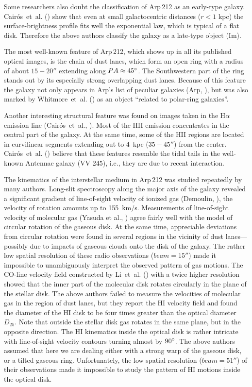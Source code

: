 \documentclass{ab}
\def\degr{\hbox{$^\circ$}}
\begin{document}
Some researchers also doubt the classification of
Arp\,212 as an early-type galaxy.  Cair\'{o}s~et~al. (\cite{cairos1:Moiseev_n}) show that even at small galactocentric distances ($r<1$ kpc) the surface-brightness profile fits well the exponential law, which is typical of a flat disk. Therefore the above authors classify the galaxy as a
late-type object (Im). 

The most well-known feature of  Arp\,212, which shows up in all
its published optical images, is the chain of dust lanes, which
form an open ring with a radius of about $15-20''$ extending along
\mbox{$PA\approx45\degr$.} The Southwestern part of the ring
stands out by its especially strong overlapping dust lanes.
Because of this feature the galaxy not only appears in Arp's list
of peculiar galaxies (Arp, \cite{arp:Moiseev_n}), but was also marked by
Whitmore~et~al. (\cite{w90:Moiseev_n}) as an object ``related to
polar-ring galaxies''.

Another interesting structural feature was found on images taken
in the H$\alpha$ emission line (Cair\'{o}s~et~al., \cite{cairos2:Moiseev_n}). Most of
the HII emission concentrates in the central part of the galaxy.
At the same time, some of the HII regions are located in
curvilinear segments extending out to 4~kpc ($35-45''$) from the
center. Cair\'{o}s~et~al. (\cite{cairos2:Moiseev_n}) believe that
these features resemble the tidal tails in the well-known Antennae
galaxy (VV 245), i.e., they are due to recent interaction.

The kinematics of the interstellar medium in  Arp\,212 was studied
repeatedly by many authors. Long-slit spectroscopy along the major
axis of the galaxy revealed a significant gradient of
line-of-sight velocity of ionized gas (Demoulin, \cite{demoulin:Moiseev_n}),
the velocity of rotation amounts up to 155~km/s. Measurements of
line-of-sight velocity of molecular gas (Yasuda et al.,   \cite{co:Moiseev_n}) agree fairly well with the model of circular rotation of the gaseous
disk. At the same time, appreciable deviations from circular
rotation were found in several regions in the vicinity of dust
lanes---possibly due to impacts of gaseous clouds onto the disk of
the galaxy. The rather low spatial resolution of these radio
observations ($beam=15''$) made it impossible to unambiguously
interpret the observed pattern of gas motions. The CO-line
velocity field constructed by Li~et~al. (\cite{li:Moiseev_n}) with a
twice higher resolution showed that the inner part of the
molecular disk rotates circularly in the plane of the stellar
disk. The above authors failed to measure the velocities of
molecular gas in the region of dust lanes, but they report the HI
velocity field and found the diameter of the HI disk to be four
times greater than the optical diameter $D_{25}$. Note that
outside the stellar disk gas rotates in the same plane, but in the
opposite direction. The HI kinematics inside the optical disk is
rather intricate with line-of-sight velocity contours turning
almost by  $90\degr$. The above authors assumed that here we are
dealing either with a strong warp of the gaseous disk, or a tilted
gaseous ring. Unfortunately, the low spatial resolution
($beam=51''$) of their observations made it impossible to study
the pattern of HI motions inside the optical disk.
\end{document}
